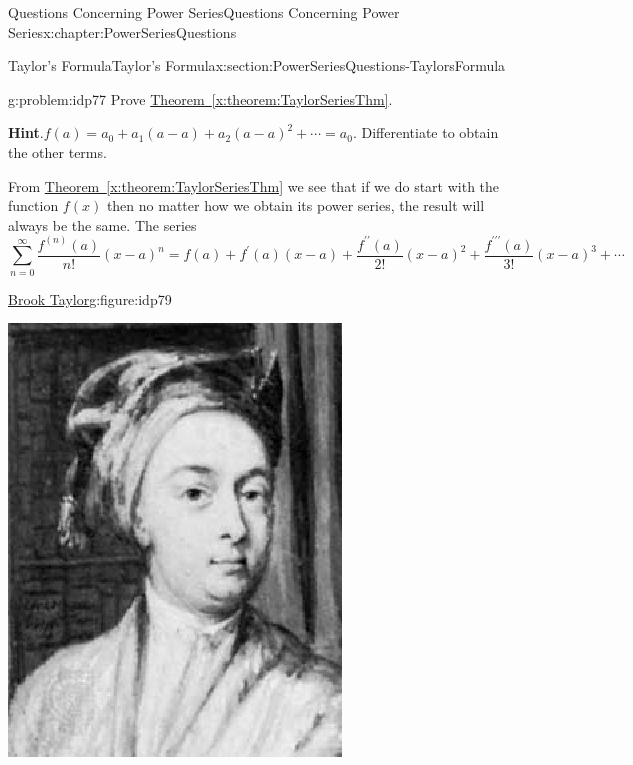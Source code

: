 \begin{chapterptx}{Questions Concerning Power Series}{}{Questions Concerning Power Series}{}{}{x:chapter:PowerSeriesQuestions}
\begin{sectionptx}{Taylor's Formula}{}{Taylor's Formula}{}{}{x:section:PowerSeriesQuestions-TaylorsFormula}
		\begin{problem}{}{g:problem:idp77}%
			 Prove \hyperref[x:theorem:TaylorSeriesThm]{Theorem~{\xreffont\ref{x:theorem:TaylorSeriesThm}}}.%
			\par\smallskip%
			\noindent\textbf{\blocktitlefont Hint}.\hypertarget{g:hint:idp78}{}\quad{}\(f(a)=a_0+a_1(a-a)+a_2(a-a)^2+\cdots=a_0\). Differentiate to obtain the other terms.%
		\end{problem}
		From \hyperref[x:theorem:TaylorSeriesThm]{Theorem~{\xreffont\ref{x:theorem:TaylorSeriesThm}}} we see that if we do start with the function \(f(x)\) then no matter how we obtain its power series, the result will always be the same. The series%
		\begin{equation*}
			\sum_{n=0}^\infty\frac{f^{(n)}(a)}{n!}(x-a)^n=f(a)+f^\prime(a)(x-a)+\frac{f^{\prime\prime}(a)}{2!}(x-a)^2+\frac{f^{\prime\prime\prime}(a)}{3!}(x-a)^3+\cdots
		\end{equation*}
		\begin{figureptx}{\href{https://mathshistory.st-andrews.ac.uk/Biographies/Taylor/}{Brook Taylor}\protect\footnotemark{}}{g:figure:idp79}{}%
			\begin{image}{0.325}{0.35}{0.325}%
				\includegraphics[width=\linewidth]{external/images/Taylor.png}

\end{image}
\end{figureptx}
\end{sectionptx}
\end{chapterptx}

